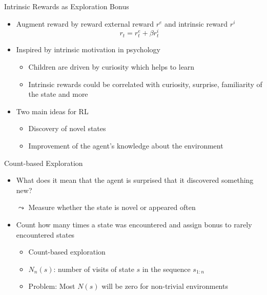 \begin{frame}[c]{Intrinsic Rewards as Exploration Bonus}
	
	\begin{itemize}
		\item Augment reward by reward external reward $r^e$ and intrinsic reward $r^i$
		$$r_t = r^e_t + \beta r_t^i $$
		\item Inspired by intrinsic motivation in psychology
		\begin{itemize}
			\item Children are driven by curiosity which helps to learn
			\item Intrinsic rewards could be correlated with curiosity, surprise, familiarity of the state and more
		\end{itemize}
		\item Two main ideas for RL
		\begin{itemize}
			\item Discovery of novel states
			\item Improvement of the agent's knowledge about the environment
		\end{itemize}
	\end{itemize}
	
\end{frame}
\begin{frame}[c]{Count-based Exploration}
	
	\begin{itemize}
		\item What does it mean that the agent is surprised that it discovered something new?
		\item[$\leadsto$] Measure whether the state is novel or appeared often
		\item Count how many times a state was encountered and assign bonus to rarely encountered states
		\begin{itemize}
			\item Count-based exploration
			\item $N_n(s)$: number of visits of state $s$ in the sequence $s_{1:n}$
			\item Problem: Most $N(s)$ will be zero for non-trivial environments
		\end{itemize}
	\end{itemize}
	
\end{frame}

